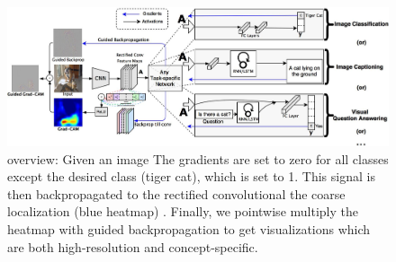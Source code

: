 \begin{figure}
    \begin{center}
  \centering
  \includegraphics[width=\textwidth]{figures/Grad-CAM_approach.png}
	\caption{\scriptsize  \gcam{} overview: Given an image 
        The gradients are set to zero for all classes except the desired class (tiger cat), which is set to 1.
		This signal is then backpropagated to the rectified convolutional  the coarse \gcam{} localization (blue heatmap) .
	Finally, we pointwise multiply the heatmap with guided backpropagation to get \cgb{} visualizations which are both high-resolution and concept-specific.
}
	\label{fig:approach}
\end{center}
\end{figure}

